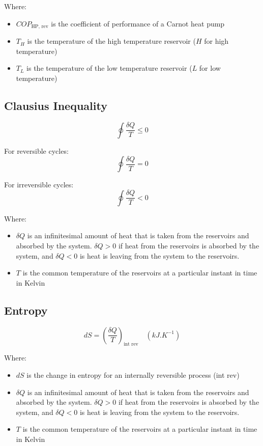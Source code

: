 \documentclass[11pt]{article}
\begin{document}
Where:
\begin{itemize}
\item \(COP_{\text{HP, rev}}\) is the coefficient of performance of a Carnot heat pump
\item \(T_{H}\) is the temperature of the high temperature reservoir (\(H\) for high temperature)
\item \(T_{L}\) is the temperature of the low temperature reservoir (\(L\) for low temperature)
\end{itemize}

 \newpage
\subsection{Clausius Inequality}
\label{sec:org50fdb41}
\[\oint \frac{\delta Q}{T} \leq 0\]

For reversible cycles:
\[\oint \frac{\delta Q}{T} = 0\]

For irreversible cycles:
\[\oint \frac{\delta Q}{T} < 0\]

Where:
\begin{itemize}
\item \(\delta Q\) is an infinitesimal amount of heat that is taken from the reservoirs and absorbed by the system. \(\delta Q > 0\) if heat from the reservoirs is absorbed by the system, and \(\delta Q < 0\) is heat is leaving from the system to the reservoirs.
\item \(T\) is the common temperature of the reservoirs at a particular instant in time in Kelvin
\end{itemize}
\subsection{Entropy}
\label{sec:org675dc1c}
\[dS = \left(\frac{\delta Q}{T} \right)_{\text{int rev}} \quad \left(\unit{kJ.K^{-1}}\right)\]

Where:
\begin{itemize}
\item \(dS\) is the change in entropy for an internally reversible process (int rev)
\item \(\delta Q\) is an infinitesimal amount of heat that is taken from the reservoirs and absorbed by the system. \(\delta Q > 0\) if heat from the reservoirs is absorbed by the system, and \(\delta Q < 0\) is heat is leaving from the system to the reservoirs.
\item \(T\) is the common temperature of the reservoirs at a particular instant in time in Kelvin
\end{itemize}
\end{document}
